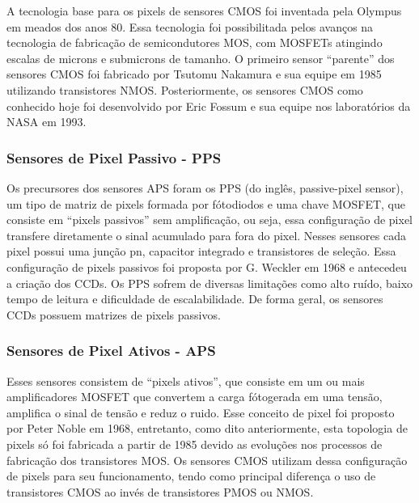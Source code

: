 \documentclass[10pt,a4paper,twocolumn]{article}
\begin{document}
		A tecnologia base para os pixels de sensores CMOS foi inventada pela Olympus em meados dos anos 80. Essa tecnologia foi possibilitada pelos avanços na tecnologia de fabricação de semicondutores MOS, com MOSFETs atingindo escalas de microns e submicrons de tamanho. O primeiro sensor ``parente'' dos sensores CMOS foi fabricado por Tsutomu Nakamura e sua equipe em 1985 utilizando transistores NMOS. Posteriormente, os sensores CMOS como conhecido hoje foi desenvolvido por Eric Fossum e sua equipe nos laboratórios da NASA em 1993.
		
	\subsubsection*{Sensores de Pixel Passivo - PPS} 
		Os precursores dos sensores APS foram os PPS (do inglês, passive-pixel sensor), um tipo de matriz de pixels formada por fótodiodos e uma chave MOSFET, que consiste em ``pixels passivos'' sem amplificação, ou seja, essa configuração de pixel transfere diretamente o sinal acumulado para fora do pixel. Nesses sensores cada pixel possui uma junção pn, capacitor integrado e transistores de seleção. Essa configuração de pixels passivos foi proposta por G. Weckler em 1968 e antecedeu a criação dos CCDs. Os PPS sofrem de diversas limitações como alto ruído, baixo tempo de leitura e dificuldade de escalabilidade. De forma geral, os sensores CCDs possuem matrizes de pixels passivos.
		
	\subsubsection*{Sensores de Pixel Ativos - APS}
		Esses sensores consistem de ``pixels ativos'', que consiste em um ou mais amplificadores MOSFET que convertem a carga fótogerada em uma tensão, amplifica o sinal de tensão e reduz o ruido. Esse conceito de pixel foi proposto por Peter Noble em 1968, entretanto, como dito anteriormente, esta topologia de pixels só foi fabricada a partir de 1985 devido as evoluções nos processos de fabricação dos transistores MOS.  Os sensores CMOS utilizam dessa configuração de pixels para seu funcionamento, tendo como principal diferença o uso de transistores CMOS ao invés de transistores PMOS ou NMOS.
	
\end{document}
